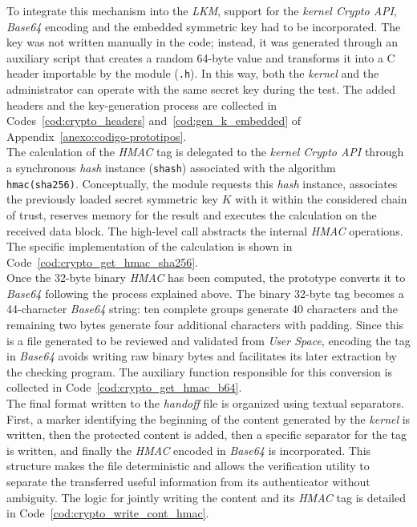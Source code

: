 To integrate this mechanism into the \textit{LKM}, support for the \textit{kernel Crypto API}, \textit{Base64} encoding and the embedded symmetric key had to be incorporated.
The key was not written manually in the code; instead, it was generated through an auxiliary script that creates a random 64-byte value and transforms it into a C header importable by the module (\texttt{.h}).
In this way, both the \textit{kernel} and the administrator can operate with the same secret key during the test.
The added headers and the key-generation process are collected in Codes~\ref{cod:crypto_headers} and~\ref{cod:gen_k_embedded} of Appendix~\ref{anexo:codigo-prototipos}.\\

The calculation of the \textit{HMAC} tag is delegated to the \textit{kernel Crypto API} through a synchronous \textit{hash} instance (\texttt{shash}) associated with the algorithm \texttt{hmac(sha256)}.
Conceptually, the module requests this \textit{hash} instance, associates the previously loaded secret symmetric key \(K\) with it within the considered chain of trust, reserves memory for the result and executes the calculation on the received data block.
The high-level call abstracts the internal \textit{HMAC} operations.
The specific implementation of the calculation is shown in Code~\ref{cod:crypto_get_hmac_sha256}.\\

Once the 32-byte binary \textit{HMAC} has been computed, the prototype converts it to \textit{Base64} following the process explained above.
The binary 32-byte tag becomes a 44-character \textit{Base64} string: ten complete groups generate 40 characters and the remaining two bytes generate four additional characters with padding.
Since this is a file generated to be reviewed and validated from \textit{User Space}, encoding the tag in \textit{Base64} avoids writing raw binary bytes and facilitates its later extraction by the checking program.
The auxiliary function responsible for this conversion is collected in Code~\ref{cod:crypto_get_hmac_b64}.\\

The final format written to the \textit{handoff} file is organized using textual separators.
First, a marker identifying the beginning of the content generated by the \textit{kernel} is written, then the protected content is added, then a specific separator for the tag is written, and finally the \textit{HMAC} encoded in \textit{Base64} is incorporated.
This structure makes the file deterministic and allows the verification utility to separate the transferred useful information from its authenticator without ambiguity.
The logic for jointly writing the content and its \textit{HMAC} tag is detailed in Code~\ref{cod:crypto_write_cont_hmac}.\\

